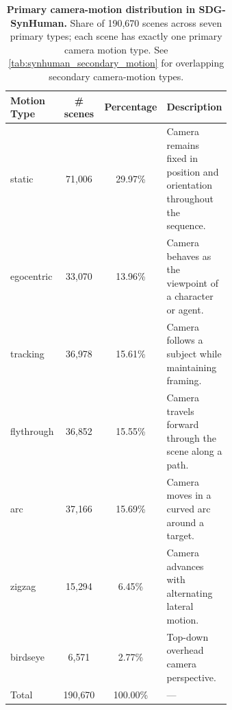 \begin{table}[t]
\centering
\captionsetup{justification=raggedright, singlelinecheck=false}
\caption{\textbf{Primary camera-motion distribution in SDG-SynHuman.} Share of 190{,}670 scenes across seven primary types; each scene has exactly one primary camera motion type. See \cref{tab:synhuman_secondary_motion} for overlapping secondary camera-motion types.}
\label{tab:synhuman_primary_motion}
\small
\begin{tabular}{p{0.16\linewidth}ccp{0.48\linewidth}}
\toprule
Motion Type & \# scenes & Percentage & Description \\
\midrule
static     & 71{,}006  & 29.97\%  & Camera remains fixed in position and orientation throughout the sequence. \\
egocentric & 33{,}070  & 13.96\%  & Camera behaves as the viewpoint of a character or agent. \\
tracking   & 36{,}978  & 15.61\%  & Camera follows a subject while maintaining framing. \\
flythrough & 36{,}852  & 15.55\%  & Camera travels forward through the scene along a path. \\
arc        & 37{,}166  & 15.69\%  & Camera moves in a curved arc around a target. \\
zigzag     & 15{,}294  &  6.45\%  & Camera advances with alternating lateral motion. \\
birdseye   &  6{,}571  &  2.77\%  & Top-down overhead camera perspective. \\
\midrule
Total      & 190{,}670 & 100.00\% & --- \\
\bottomrule
\end{tabular}
\end{table}
 
